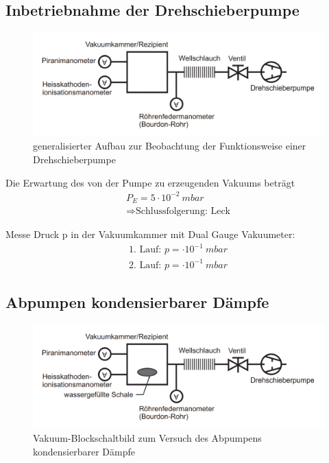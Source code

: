 \documentclass[12pt, a4paper]{scrartcl}
\begin{document}
	\subsection{Inbetriebnahme der Drehschieberpumpe}
	
        \begin{figure}[H]
            \includegraphics[width=.5\paperwidth]{aufbau21}
            \caption{generalisierter Aufbau zur Beobachtung der Funktionsweise einer Drehschieberpumpe}
            \label{fig:anord1}
        \end{figure}
    
    	
    	
    	Die Erwartung des von der Pumpe zu erzeugenden Vakuums beträgt
    	\begin{align*}
	    	P_E=5\cdot 10^{-2}\ mbar\\
	    	\Rightarrow \text{Schlussfolgerung: Leck}
    	\end{align*}
    	
    	
    	Messe Druck p  in der Vakuumkammer mit Dual Gauge Vakuumeter:
    	\begin{align*}
	    	\text{1. Lauf: }p=\cdot 10^{-1}\ mbar\\
	    	\text{2. Lauf: }p=\cdot 10^{-1}\ mbar
    	\end{align*}
    
    
    
    \subsection{Abpumpen kondensierbarer Dämpfe}
    
		\begin{figure}[H]
			\centering
			\includegraphics[width=.5\paperwidth]{aufbau22}
			\caption{Vakuum-Blockschaltbild zum Versuch des Abpumpens kondensierbarer Dämpfe}
            \label{fig:anord2}
		\end{figure}
	
\end{document}
